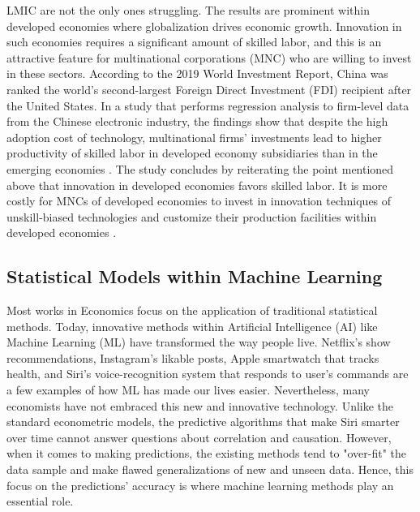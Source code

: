 \documentclass[12pt,oneside]{book} %
\begin{document}
LMIC are not the only ones struggling. The results are prominent within developed economies where globalization drives economic growth. Innovation in such economies requires a significant amount of skilled labor, and this is an attractive feature for multinational corporations (MNC) who are willing to invest in these sectors. According to the 2019 World Investment Report, China was ranked the world's second-largest Foreign Direct Investment (FDI) recipient after the United States. In a study that performs regression analysis to firm-level data from the Chinese electronic industry, the findings show that despite the high adoption cost of technology, multinational firms' investments lead to higher productivity of skilled labor in developed economy subsidiaries than in the emerging economies \cite{li2010multinational}. The study concludes by reiterating the point mentioned above that innovation in developed economies favors skilled labor. It is more costly for MNCs of developed economies to invest in innovation techniques of unskill-biased technologies and customize their production facilities within developed economies \cite{li2010multinational}.


\subsection{Statistical Models within Machine Learning}

\hspace{20pt}Most works in Economics focus on the application of traditional statistical methods. Today, innovative methods within Artificial Intelligence (AI) like Machine Learning (ML) have transformed the way people live. Netflix's show recommendations, Instagram's likable posts, Apple smartwatch that tracks health, and Siri's voice-recognition system that responds to user's commands are a few examples of how ML has made our lives easier. Nevertheless, many economists have not embraced this new and innovative technology. Unlike the standard econometric models, the predictive algorithms that make Siri smarter over time cannot answer questions about correlation and causation. However, when it comes to making predictions, the existing methods tend to "over-fit" the data sample and make flawed generalizations of new and unseen data. Hence, this focus on the predictions' accuracy is where machine learning methods play an essential role.
\end{document}
